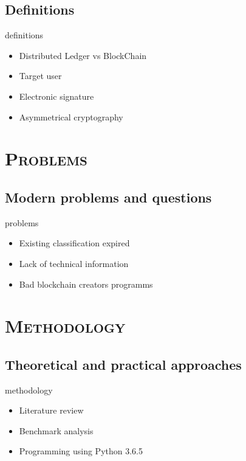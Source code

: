 \documentclass[xcolor=x11names,compress]{beamer}
\renewcommand{\(}{\begin{columns}}
\renewcommand{\)}{\end{columns}}
\newcommand{\<}[1]{\begin{column}{#1}}
\renewcommand{\>}{\end{column}}
\begin{document}
\subsection{Definitions}
\begin{frame}{definitions}
    \begin{itemize}
        \item Distributed Ledger vs BlockChain
        \item Target user
        \item Electronic signature
        \item Asymmetrical cryptography
    \end{itemize}
\end{frame}


\section{\scshape Problems} %
\subsection{Modern problems and questions}
\begin{frame}{problems}
\begin{itemize}
        \item Existing classification expired
        \item Lack of technical information
        \item Bad blockchain creators programms
\end{itemize}
\end{frame}


\section{\scshape Methodology}
\subsection{Theoretical and practical approaches}
\begin{frame}{methodology}
    \begin{itemize}
        \item Literature review
        \item Benchmark analysis
        \item Programming using Python 3.6.5
    \end{itemize}
\end{frame}
\end{document}
